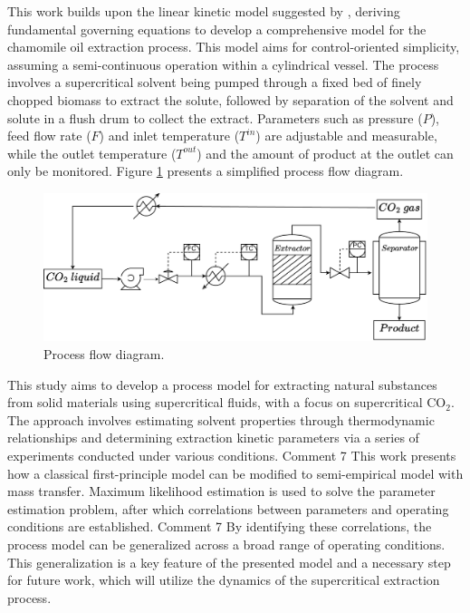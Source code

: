 \documentclass[a4paper,fleqn]{cas-dc}
\begin{document}
This work builds upon the linear kinetic model suggested by \citet{Reverchon1996}, deriving fundamental governing equations to develop a comprehensive model for the chamomile oil extraction process. This model aims for control-oriented simplicity, assuming a semi-continuous operation within a cylindrical vessel. The process involves a supercritical solvent being pumped through a fixed bed of finely chopped biomass to extract the solute, followed by separation of the solvent and solute in a flush drum to collect the extract. Parameters such as pressure ($P$), feed flow rate ($F$) and inlet temperature ($T^{in}$) are adjustable and measurable, while the outlet temperature ($T^{out}$) and the amount of product at the outlet can only be monitored. Figure \ref{fig: SFE_drawing} presents a simplified process flow diagram.

\begin{figure}[h!]
	\centering
	\includegraphics[width=\columnwidth]{Figures/PFD.drawio.pdf}
	\caption{Process flow diagram.}
	\label{fig: SFE_drawing}
\end{figure}

This study aims to develop a process model for extracting natural substances from solid materials using supercritical fluids, with a focus on supercritical CO$_2$. The approach involves estimating solvent properties through thermodynamic relationships and determining extraction kinetic parameters via a series of experiments conducted under various conditions. {\color{red}Comment 7} {\color{blue} This work presents how a classical first-principle model can be modified to semi-empirical model with mass transfer}. Maximum likelihood estimation is used to solve the parameter estimation problem, after which correlations between parameters and operating conditions are established. {\color{red}Comment 7} {\color{blue} By identifying these correlations, the process model can be generalized across a broad range of operating conditions. This generalization is a key feature of the presented model and a necessary step for future work, which will utilize the dynamics of the supercritical extraction process}.
\end{document}
